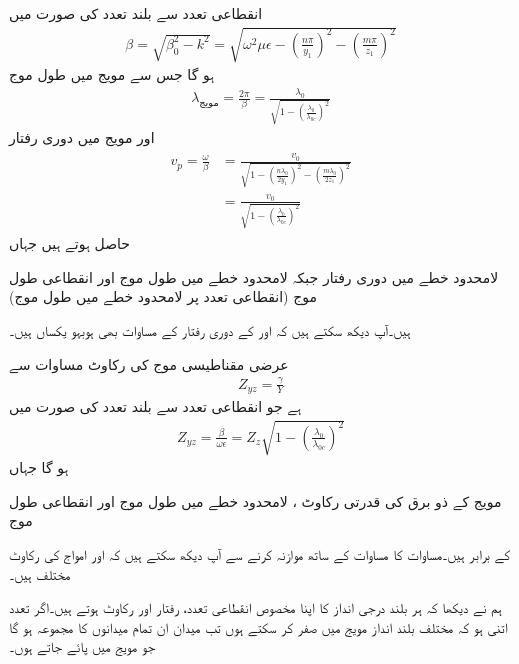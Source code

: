 انقطاعی تعدد سے بلند تعدد  کی صورت میں
\begin{align}
\beta=\sqrt{\beta_0^2-k^2}=\sqrt{\omega^2 \mu \epsilon-\left(\frac{n\pi}{y_1}\right)^2-\left(\frac{m\pi}{z_1}\right)^2}
\end{align}
ہو گا جس سے مویج میں طول موج
\begin{align}
\lambda_{\text{مویج}}=\frac{2\pi}{\beta}=\frac{\lambda_0}{\sqrt{1-\left(\frac{\lambda_0}{\lambda_{0c}}\right)^2}}
\end{align}
اور مویج میں  دوری رفتار
\begin{gather}
\begin{aligned}
v_p=\frac{\omega}{\beta}&=\frac{v_0}{\sqrt{1-\left(\frac{n\lambda_0}{2y_1}\right)^2-\left(\frac{m\lambda_0}{2z_1}\right)^2}}\\
&=\frac{v_0}{\sqrt{1-\left(\frac{\lambda_0}{\lambda_{0c}}\right)^2}}
\end{aligned}
\end{gather}
حاصل ہوتے ہیں جہاں
\begin{description}
 لامحدود خطے میں دوری رفتار  جبکہ 
 لامحدود خطے میں طول موج اور
 انقطاعی طول موج (انقطاعی تعدد پر لامحدود خطے میں طول موج)
\end{description}
ہیں۔آپ دیکھ سکتے ہیں کہ  اور  کے دوری رفتار کے مساوات بھی ہوبہو یکساں ہیں۔

عرضی مقناطیسی موج کی رکاوٹ مساوات  سے 
\begin{align*}
Z_{yz}=\frac{\gamma}{Y}
\end{align*}
ہے جو انقطاعی تعدد سے بلند تعدد  کی صورت میں
\begin{align}\label{مساوات_مویج_عرضی_مقناطیسی_رکاوٹ_حتمی}
Z_{yz}=\frac{\beta}{\omega \epsilon}=Z_z \sqrt{1-\left(\frac{\lambda_0}{\lambda_{0c}}\right)^2}
\end{align}
ہو گا جہاں
\begin{description}
 مویج کے ذو برق کی قدرتی رکاوٹ ، 
 لامحدود خطے میں طول موج اور
 انقطاعی طول موج
\end{description}
کے برابر ہیں۔مساوات  کا مساوات  کے ساتھ موازنہ کرنے سے آپ دیکھ سکتے ہیں کہ  اور  امواج کی رکاوٹ مختلف ہیں۔

ہم نے دیکھا کہ ہر بلند درجی انداز کا اپنا مخصوص انقطاعی تعدد، رفتار اور رکاوٹ ہوتے ہیں۔اگر تعدد اتنی ہو کہ مختلف بلند انداز مویج میں صفر کر سکتے ہوں تب میدان ان تمام میدانوں کا مجموعہ ہو گا جو مویج میں پائے جاتے ہوں۔ 

